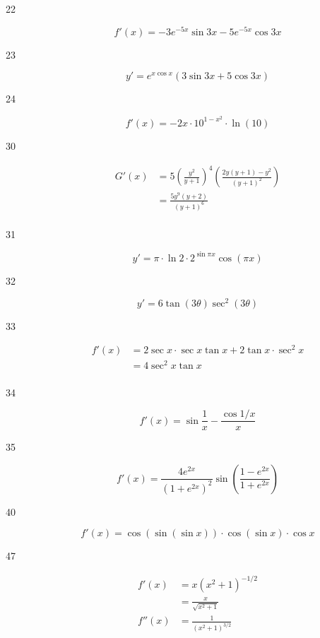 \documentclass[letterpaper]{exam}
\begin{document}
\begin{description}
    \item[22] 
      \[
        f'(x) = \boxed{ -3e^{-5x} \sin 3x - 5e^{-5x} \cos 3x }
      \]

    \item[23] 
      \[
        y' = \boxed{ e^{x \cos x} ( 3 \sin 3x + 5 \cos 3x ) }
      \]

    \item[24] 
      \[
        f'(x) = \boxed{ -2x \cdot 10^{1 - x^2} \cdot \ln(10) } 
      \]

    \item[30] 
      \begin{align*}
        G'(x) & = 5 \left( \frac{y^2}{y + 1} \right)^4 \left(  \frac{2y (y + 1) - y^2 }{(y + 1)^2}  \right) \\
              & = \boxed{ \frac{5 y^9 (y + 2)}{(y + 1)^6} } \\
      \end{align*}

    \item[31] 
      \[
        y' = \boxed{ \pi \cdot \ln 2 \cdot 2^{\sin \pi x} \cos(\pi x) }
      \]

    \item[32] 
      \[
        y' = \boxed{ 6 \tan(3 \theta) \sec^2 (3 \theta) }
      \]

    \item[33] 
      \begin{align*}
        f'(x) & = 2 \sec x \cdot \sec x \tan x + 2 \tan x \cdot \sec^2 x \\
              & = \boxed{ 4 \sec^2 x \tan x } \\
      \end{align*}

    \item[34] 
      \[
        f'(x) = \boxed{ \sin \frac{1}{x} - \frac{\cos 1/x}{x} } 
      \]

    \item[35] 
      \[
        f'(x) = \boxed{ \frac{4 e^{2x}}{\left( 1 + e^{2x} \right)^2} 
          \sin \left( \frac{1 - e^{2x}}{1 + e^{2x}} \right) }
      \]

    \item[40] 
      \[
        f'(x) = \boxed{ \cos(\sin(\sin x)) \cdot \cos(\sin x) \cdot \cos x }
      \]

    \item[47] 
      \begin{align*}
        f'(x)  & = x \left( x^2 + 1 \right)^{-1/2} \\
               & = \boxed{ \frac{x}{\sqrt{x^2 + 1}} } \\
        f''(x) & = \boxed{ \frac{1}{\left( x^2 + 1 \right)^{3/2}} } \\
      \end{align*}


\end{description}
\end{document}

